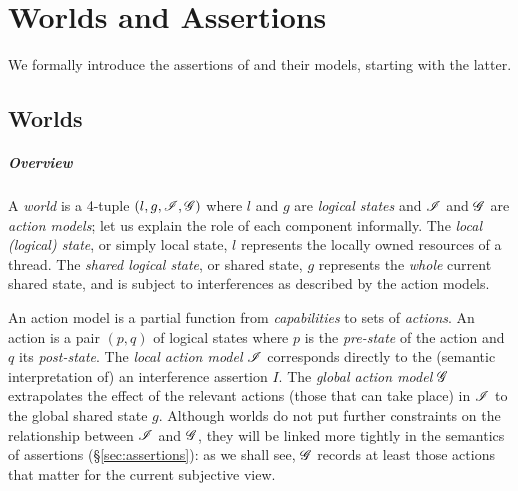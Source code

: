 \chapter{\colosl Worlds and Assertions}\label{sec:logic}
We formally introduce the assertions of \colosl and their models,
starting with the latter.

\section{Worlds}
\paragraph{Overview}
A \emph{world} is a 4-tuple $(l,g,\mathscr{I},\mathscr{G})$ where $l$ and $g$ are \emph{logical states} and $\mathscr{I}$ and $\mathscr{G}$ are \emph{action models}; let us explain the role of each component informally. The \emph{local (logical) state}, or simply local state, $l$ represents the locally owned resources of a thread. The \emph{shared logical state}, or shared state, $g$ represents the \emph{whole} current shared state, and is subject to interferences as described by the action models.

An action model is a partial function from \emph{capabilities} to sets of \emph{actions}. An action is a pair $(p,q)$ of logical states where $p$ is the \emph{pre-state} of the action and $q$ its \emph{post-state}.  The \emph{local action model} $\mathscr{I}$ corresponds directly to the (semantic interpretation of) an interference assertion $I$. The \emph{global action model} $\mathscr{G}$ extrapolates the effect of the relevant actions (those that can take place) in $\mathscr{I}$ to the global shared state $g$. Although worlds do not put further constraints on the
relationship between $\mathscr{I}$ and $\mathscr{G}$, they will be linked more tightly in the semantics of assertions (\S\ref{sec:assertions}): as we shall see, $\mathscr{G}$ records at least those actions that matter for the current subjective view.

